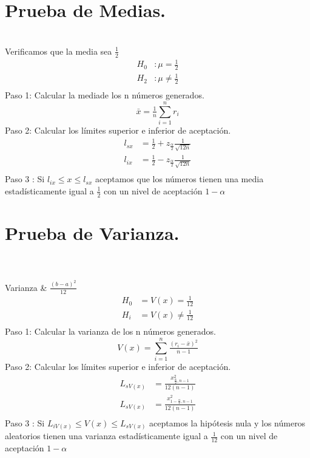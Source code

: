 \documentclass[es-lat]{article}
\begin{document}
\section{Prueba de Medias.}
\\Verificamos que la media sea $\tfrac{1}{2}$
\begin{align*} 
H_{0} &:  \mu=\tfrac{1}{2} \\ 
H_{2} &:  \mu \neq \tfrac{1}{2} \\ 
\end{align*}
Paso 1: Calcular la mediade los n números generados.
\[
\bar{x}=\tfrac{1}{n}\sum_{i=1}^{n}r_{i}
\]
Paso 2: Calcular los límites superior e inferior de aceptación.
\begin{align*} 
l_{sx} &=  \tfrac{1}{2} + z_{\tfrac{\alpha}{2}}\tfrac{1}{\sqrt{12n}} \\ 
l_{ix} &=  \tfrac{1}{2} - z_{\tfrac{\alpha}{2}}\tfrac{1}{\sqrt{12n}} \\ 
\end{align*}
Paso 3 : Si $l_{ix}\leq x \leq l_{sx}$ aceptamos que los números tienen una media estadísticamente igual a $\tfrac{1}{2}$ con un nivel de aceptación $1-\alpha$



\section{Prueba de Varianza.}
\\\\Varianza & $\tfrac{{(b-a)}^2}{12}$\\

\begin{align*} 
H_{0} &=  V(x)=\tfrac{1}{12} \\ 
H_{i} &=  V(x) \neq \tfrac{1}{12} \\ 
\end{align*}
Paso 1: Calcular la varianza de los n números generados.
\[
V(x)=\sum_{i=1}^{n}\tfrac{(r_{i}-\bar{x})^2}{n-1}
\]
Paso 2: Calcular los límites superior e inferior de aceptación.
\begin{align*} 
L_{sV(x)} &=  \tfrac{x^2_{\tfrac{\alpha}{2},n-1}}{12(n-1)}\\ 
L_{sV(x)} &=  \tfrac{x^2_{1-\tfrac{\alpha}{2},n-1}}{12(n-1)}\\ 
\end{align*}
Paso 3 : Si $L_{iV(x)}\leq V(x) \leq L_{sV(x)}$ aceptamos la hipótesis nula y los números aleatorios tienen una varianza estadísticamente igual a $\tfrac{1}{12}$ con un nivel de aceptación $1-\alpha$\\\\
\end{document}

